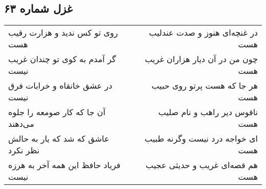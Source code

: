 \begin{center}
\section*{غزل شماره ۶۳}
\label{sec:sh063}
\begin{longtable}{l p{0.5cm} r}
روی تو کس ندید و هزارت رقیب هست
&&
در غنچه‌ای هنوز و صدت عندلیب هست
\\
گر آمدم به کوی تو چندان غریب نیست
&&
چون من در آن دیار هزاران غریب هست
\\
در عشق خانقاه و خرابات فرق نیست
&&
هر جا که هست پرتو روی حبیب هست
\\
آن جا که کار صومعه را جلوه می‌دهند
&&
ناقوس دیر راهب و نام صلیب هست
\\
عاشق که شد که یار به حالش نظر نکرد
&&
ای خواجه درد نیست وگرنه طبیب هست
\\
فریاد حافظ این همه آخر به هرزه نیست
&&
هم قصه‌ای غریب و حدیثی عجیب هست
\\
\end{longtable}
\end{center}
